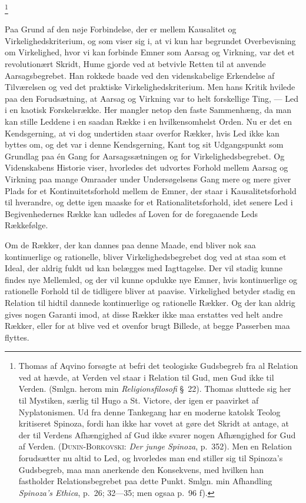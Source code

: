 \documentclass[12pt]{article}
\newcommand{\opage}[1]{\marginnote{\footnotesize\textit{[#1]}}}
\begin{document}
\footnote{Thomas af Aqvino forsøgte at befri det teologiske Gudsbegreb
fra al Relation ved at hævde, at Verden vel staar i Relation til Gud,
men Gud ikke til Verden. (Smlgn. herom min \textit{Religionsfilosofi}
§~22). Thomas sluttede sig her til Mystiken, særlig til Hugo a St.
Victore, der igen er paavirket af Nyplatonismen. Ud fra denne Tankegang
har en moderne katolsk Teolog kritiseret Spinoza, fordi han ikke har
vovet at gøre det Skridt at antage, at der til Verdens Afhængighed af
Gud ikke svarer nogen Afhængighed for Gud af Verden.
(\textsc{Dunin-Borkovski}: \textit{Der junge Spinoza}, p.~352). Men en
Relation forudsætter nu altid to Led, og hvorledes man end stiller sig
til Spinoza's Gudsbegreb, maa man anerkende den Konsekvens, med hvilken
han fastholder Relationsbegrebet paa dette Punkt. Smlgn. min Afhandling
\textit{Spinoza's Ethica}, p.~26; 32---35; men ogsaa p.~96 f).}

Paa Grund af den nøje Forbindelse, der er mellem Kausalitet og
Virkelighedskriterium, og som viser sig i, at vi kun har begrundet
Overbevisning om Virkelighed, hvor vi kan forbinde Emner som Aarsag og
Virkning, var det et revolutionært Skridt, Hume gjorde ved at betvivle
Retten til at anvende Aarsagsbegrebet. Han rokkede baade ved den
videnskabelige Erkendelse af Tilværelsen og ved det praktiske
Virkelighedskriterium. Men hans Kritik hvilede paa den Forudsætning, at
Aarsag og Virkning var to helt forskellige Ting, --- Led i en kaotisk
Forskelsrække. Her mangler netop den faste Sammenhæng, da man kan stille
Leddene i en saadan Række i en hvilkensomhelst Orden. Nu er det en
Kendsgerning, at vi dog undertiden staar overfor Rækker, hvis Led ikke
kan byttes om, og det var i denne Kendsgerning, Kant tog sit
Udgangspunkt som Grundlag paa én Gang for Aarsagssætningen og for
Virkelighedsbegrebet. Og Videnskabens Historie viser, hvorledes det
udvortes Forhold mellem Aarsag og Virkning paa mange Omraader under
Undersøgelsens Gang mere og mere giver Plads for et Kontinuitetsforhold
mellem de Emner,
\opage{48} \setcounter{footnote}{0}
der staar i Kausalitetsforhold til hverandre, og dette igen maaske for
et Rationalitetsforhold, idet senere Led i Begivenhedernes Række kan
udledes af Loven for de foregaaende Leds Rækkefølge.

Om de Rækker, der kan dannes paa denne Maade, end bliver nok saa
kontinuerlige og rationelle, bliver Virkelighedsbegrebet dog ved at staa
som et Ideal, der aldrig fuldt ud kan belægges med Iagttagelse. Der vil
stadig kunne findes nye Mellemled, og der vil kunne opdukke nye Emner,
hvis kontinuerlige og rationelle Forhold til de tidligere bliver at
paavise. Virkelighed betyder stadig en Relation til hidtil dannede
kontinuerlige og rationelle Rækker. Og der kan aldrig gives nogen
Garanti imod, at disse Rækker ikke maa erstattes ved helt andre Rækker,
eller for at blive ved et ovenfor brugt Billede, at begge Passerben maa
flyttes.
\end{document}
